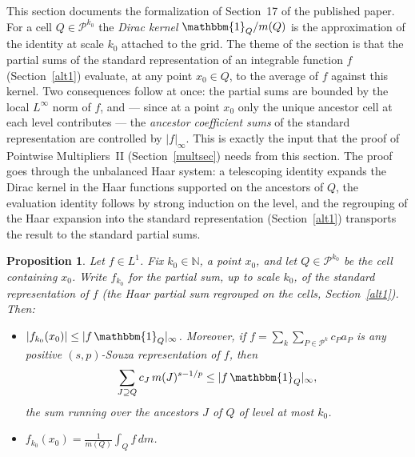 \documentclass[11pt]{amsart}
\newtheorem{proposition}[theorem]{Proposition}
\theoremstyle{definition}
\begin{document}
This section documents the formalization of Section~17 of the published
paper. For a cell $Q \in \mathcal{P}^{k_0}$ the \emph{Dirac kernel}
$\mathbbm{1}_Q/m(Q)$ is the approximation of the identity at scale $k_0$
attached to the grid. The theme of the section is that the partial sums of
the standard representation of an integrable function $f$
(Section~\ref{alt1}) evaluate, at any point $x_0 \in Q$, to the average of
$f$ against this kernel. Two consequences follow at once: the partial sums
are bounded by the local $L^\infty$ norm of $f$, and --- since at a point
$x_0$ only the unique ancestor cell at each level contributes --- the
\emph{ancestor coefficient sums} of the standard representation are
controlled by $|f|_\infty$. This is exactly the input that the proof of
Pointwise Multipliers~II (Section~\ref{multsec}) needs from this section.
The proof goes through the unbalanced Haar system: a telescoping identity
expands the Dirac kernel in the Haar functions supported on the ancestors
of $Q$, the evaluation identity follows by strong induction on the level,
and the regrouping of the Haar expansion into the standard representation
(Section~\ref{alt1}) transports the result to the standard partial sums.

\begin{proposition}\label{boup}
Let $f \in L^1$. Fix $k_0 \in \mathbb{N}$, a point $x_0$, and let
$Q \in \mathcal{P}^{k_0}$ be the cell containing $x_0$. Write $f_{k_0}$ for
the partial sum, up to scale $k_0$, of the standard representation of $f$
(the Haar partial sum regrouped on the cells, Section~\ref{alt1}). Then:
\begin{itemize}
\item[A.] $|f_{k_0}(x_0)| \leq |f\,\mathbbm{1}_Q|_{\infty}$. Moreover, if
$f = \sum_k \sum_{P \in \mathcal{P}^k} c_P a_P$ is \emph{any} positive
$(s,p)$-Souza representation of $f$, then
$$\sum_{J \supseteq Q} c_J\, m(J)^{s-1/p} \leq |f\,\mathbbm{1}_Q|_{\infty},$$
the sum running over the ancestors $J$ of $Q$ of level at most $k_0$.
\item[B.] $\displaystyle f_{k_0}(x_0) = \frac{1}{m(Q)} \int_Q f\, dm$.
\end{itemize}
\end{proposition}
\end{document}
